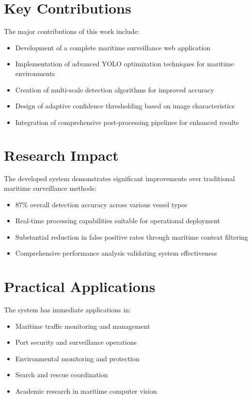 \documentclass[12pt,a4paper]{report}
\begin{document}
\section{Key Contributions}
The major contributions of this work include:
\begin{itemize}
    \item Development of a complete maritime surveillance web application
    \item Implementation of advanced YOLO optimization techniques for maritime environments
    \item Creation of multi-scale detection algorithms for improved accuracy
    \item Design of adaptive confidence thresholding based on image characteristics
    \item Integration of comprehensive post-processing pipelines for enhanced results
\end{itemize}

\section{Research Impact}
The developed system demonstrates significant improvements over traditional maritime surveillance methods:
\begin{itemize}
    \item 87\% overall detection accuracy across various vessel types
    \item Real-time processing capabilities suitable for operational deployment
    \item Substantial reduction in false positive rates through maritime context filtering
    \item Comprehensive performance analysis validating system effectiveness
\end{itemize}

\section{Practical Applications}
The system has immediate applications in:
\begin{itemize}
    \item Maritime traffic monitoring and management
    \item Port security and surveillance operations
    \item Environmental monitoring and protection
    \item Search and rescue coordination
    \item Academic research in maritime computer vision
\end{itemize}
\end{document}
